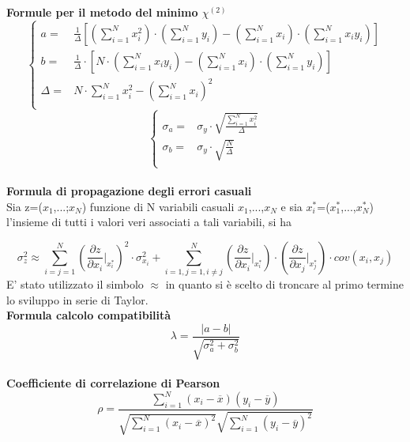 \documentclass[a4paper,11pt,oneside]{article}
\begin{document}
\textbf{Formule per il metodo del minimo ${\chi}^{(2)}$}
\begin{equation*}
        \begin{cases}
    a=&\frac{1}{\Delta}[(\sum\limits_{i=1}^{N}{x_{i}^{2}})\cdot(\sum\limits_{i=1}^{N}{y_{i}})-(\sum\limits_{i=1}^{N}{x_{i}})\cdot(\sum\limits_{i=1}^{N}{x_{i}y_{i}})] \\ 
    b=&\frac{1}{\Delta }\cdot \left [N\cdot \left ( \sum\limits_{i=1}^{N}x_i y_i \right )-\left ( \sum\limits_{i=1}^{N}x_i \right )\cdot \left ( \sum\limits_{i=1}^{N}y_i \right )  \right ]\\
    \Delta=& N\cdot \sum\limits_{i=1}^{N} x_i^{2} - \left ( \sum\limits_{i=1}^{N}x_i \right )^{2}\\
    \end{cases}
\end{equation*}
\begin{equation*}
    \begin{cases}
    \sigma_{a}=&\sigma_{y}\cdot\sqrt{\frac{\sum_{i=1}^{N}{x_{i}^{2}}}{\Delta}} \\
    \sigma_{b}=&\sigma_y\cdot \sqrt{\frac{N}{\Delta }}\\
    \end{cases}
    \label{equation:err_chi_quadro}
\end{equation*}
\\
\textbf{Formula di propagazione degli errori casuali}\\

Sia z=($x_1$,...;$x_N$) funzione di N variabili casuali $x_1$,...,$x_N$ e sia ${x_i^\ast}$=($x_1^\ast$,...,$x_N^{\ast}$) l'insieme di tutti i valori veri associati a tali variabili, si ha 

\begin{equation*}
    \sigma_z^{2}\approx  \sum_{i=j=1}^{N}\left ( \frac{\partial z}{\partial x_i}\Big|_{x_i^{\ast}} \right )^{2}\cdot\sigma_{x_i}^{2} +\sum_{i=1,j=1,i\neq j}^{N}\left (\frac{\partial z }{\partial x_i}\Big|_{x_i^{\ast}} \right ) \cdot \left ( \frac{\partial z}{\partial x_j} \Big|_{x_j^{\ast}} \right )\cdot cov(x_i,x_j)\label{eq:prop_errori}
\end{equation*}
E' stato utilizzato il simbolo $\approx$ in quanto si è scelto di troncare al primo termine lo sviluppo in serie di Taylor.\\


\textbf{Formula calcolo compatibilità}\\
\begin{equation*}
    \lambda=\frac{\left|a-b\right|}{\sqrt{\sigma^{2}_{a}+\sigma^{2}_{b}}}
\end{equation*}\\
\textbf{Coefficiente di correlazione di Pearson}\\
\begin{equation*}
    \rho=  \frac{\sum_{i=1}^{N}(x_i - \overline{x}
    )(y_i - \overline{y})}{\sqrt{\sum_{i=1}^{N}(x_i -\overline{x})^2}\sqrt{\sum_{i=1}^{N}(y_i - \overline{y})^2}}
\end{equation*}
\end{document}
